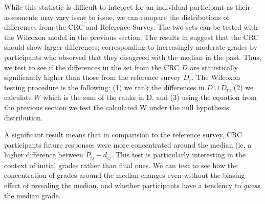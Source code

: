 While this statistic is difficult to intepret for an individual participant as their assesments may vary issue to issue, we can compare the distributions of differences from the CRC and Reference Survey.
The two sets can be tested with the Wilcoxon model in the previous section.
The results in \cite{???} suggest that the CRC should show larger differences; corresponding to increasingly moderate grades by participants who observed that they disagreed with the median in the past.
Thus, we test to see if the differences in the set from the CRC $D$ are statistically significantly higher than those from the reference survey $D_r$.
The Wilcoxon testing procedure is the following: (1) we rank the differences in $D \cup D_r$, (2) we calculate $W$ which is the sum of the ranks in D, and 
(3) using the equation from the previous section we test the calculated W under the null hypothesis distribution.

A significant result means that in comparision to the reference survey, CRC participants future responses were more concentrated around the median (ie. a higher difference between $P_{ij} - d_{ij}$.
This test is particularly interesting in the context of initial grades rather than final ones.
We can test to see how the concentration of grades around the median changes even without the biasing effect of revealing the median, and whether participants have a tendency to \emph{guess} the median grade.
